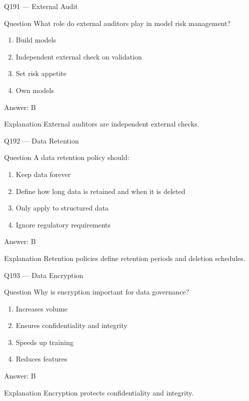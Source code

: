\documentclass[aspectratio=169,8pt]{beamer}
\begin{document}
		\begin{frame}{Q191 --- External Audit}
			\begin{block}{Question}
				What role do external auditors play in model risk management?
				\begin{enumerate}
					\item Build models
					\item Independent external check on validation
					\item Set risk appetite
					\item Own models
				\end{enumerate}
			\end{block}
			\begin{exampleblock}{Answer: B}\end{exampleblock}
			\begin{block}{Explanation}
				External auditors are independent external checks.
			\end{block}
		\end{frame}
		
		\begin{frame}{Q192 --- Data Retention}
			\begin{block}{Question}
				A data retention policy should:
				\begin{enumerate}
					\item Keep data forever
					\item Define how long data is retained and when it is deleted
					\item Only apply to structured data
					\item Ignore regulatory requirements
				\end{enumerate}
			\end{block}
			\begin{exampleblock}{Answer: B}\end{exampleblock}
			\begin{block}{Explanation}
				Retention policies define retention periods and deletion schedules.
			\end{block}
		\end{frame}
		
		\begin{frame}{Q193 --- Data Encryption}
			\begin{block}{Question}
				Why is encryption important for data governance?
				\begin{enumerate}
					\item Increases volume
					\item Ensures confidentiality and integrity
					\item Speeds up training
					\item Reduces features
				\end{enumerate}
			\end{block}
			\begin{exampleblock}{Answer: B}\end{exampleblock}
			\begin{block}{Explanation}
				Encryption protects confidentiality and integrity.
			\end{block}
		\end{frame}
		
\end{document}
